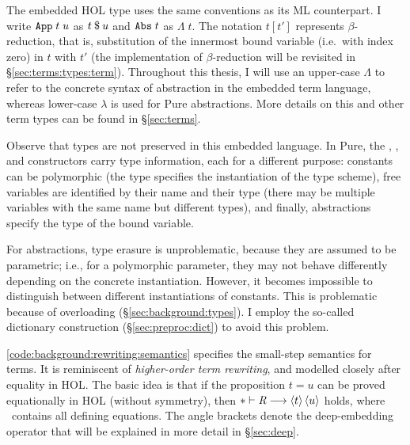 The embedded HOL  type uses the same conventions as its ML counterpart.
I write $\texttt{\textup{App}}\;t\;u$ as $t\mathbin{\$}u$ and $\texttt{\textup{Abs}}\;t$ as $\Lambda\;t$.
The notation $t [t']$ represents $\beta$-reduction, that is, substitution of the innermost bound variable (i.e.\ with index zero) in $t$ with $t'$ (the implementation of $\beta$-reduction will be revisited in §\ref{sec:terms:types:term}).
Throughout this thesis, I will use an upper-case $\Lambda$ to refer to the concrete syntax of abstraction in the embedded term language, whereas lower-case $\lambda$ is used for Pure abstractions.
More details on this and other term types can be found in §\ref{sec:terms}.

Observe that types are not preserved in this embedded language.
In Pure, the , , and  constructors carry type information, each for a different purpose:
constants can be polymorphic (the type specifies the instantiation of the type scheme), free variables are identified by their name and their type (there may be multiple variables with the same name but different types), and finally, abstractions specify the type of the bound variable.


\noindent
For abstractions, type erasure is unproblematic, because they are assumed to be parametric; i.e., for a polymorphic parameter, they may not behave differently depending on the concrete instantiation.
However, it becomes impossible to distinguish between different instantiations of constants.
This is problematic because of overloading (§\ref{sec:background:types}).
I employ the so-called dictionary construction (§\ref{sec:preproc:dict}) to avoid this problem.

\cref{code:background:rewriting:semantics} specifies the small-step semantics for terms.
It is reminiscent of \emph{higher-order term rewriting}, and modelled closely after equality in HOL.
The basic idea is that if the proposition $t = u$ can be proved equationally in HOL (without symmetry), then $* \vdash \textit{R} \longrightarrow \left\langle t\right\rangle{\ensuremath{\left\langle u\right\rangle}}$ holds, where \R\ contains all defining equations.
The angle brackets denote the deep-embedding operator that will be explained in more detail in §\ref{sec:deep}.

